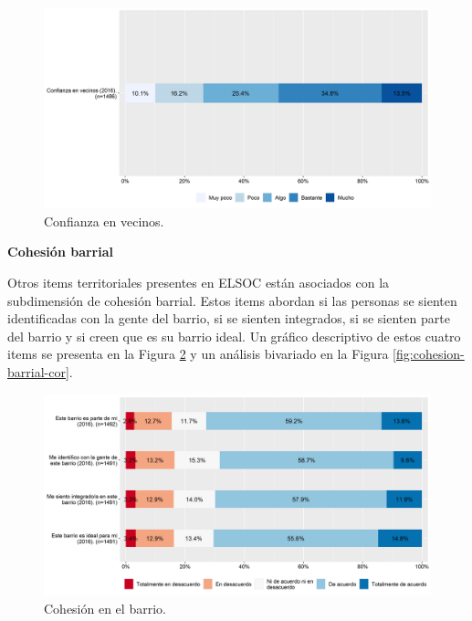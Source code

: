 \documentclass[
  12pt,
]{book}
\begin{document}
\begin{figure}[H]

{\centering \includegraphics[width=1\linewidth,height=1\textheight]{output/graphs/confianza-vecinos} 

}

\caption{Confianza en vecinos.}\label{fig:confianza-vecinos}
\end{figure}

\textbf{Cohesión barrial}

Otros items territoriales presentes en ELSOC están asociados con la subdimensión de cohesión barrial. Estos items abordan si las personas se sienten identificadas con la gente del barrio, si se sienten integrados, si se sienten parte del barrio y si creen que es su barrio ideal. Un gráfico descriptivo de estos cuatro items se presenta en la Figura \ref{fig:cohesion-barrial} y un análisis bivariado en la Figura \ref{fig:cohesion-barrial-cor}.

\begin{figure}[H]

{\centering \includegraphics[width=1\linewidth,height=1\textheight]{output/graphs/cohesion-barrial} 

}

\caption{Cohesión en el barrio.}\label{fig:cohesion-barrial}
\end{figure}
\end{document}
